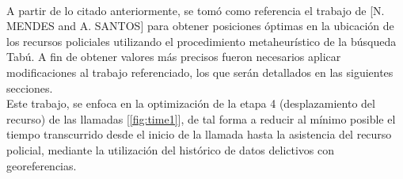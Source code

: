 \\A partir de lo citado anteriormente, se tomó como referencia el trabajo de [N. MENDES and A. SANTOS]\cite{mendesd} para obtener posiciones óptimas en la ubicación de los recursos policiales utilizando el procedimiento metaheurístico de la búsqueda Tabú. A fin de obtener valores más precisos fueron necesarios aplicar modificaciones al trabajo referenciado, los que serán detallados en las siguientes secciones.\\
Este trabajo, se enfoca en la optimización de la etapa 4 (desplazamiento del recurso) de las llamadas [\cref{fig:time1}], de tal forma a reducir al mínimo posible el tiempo transcurrido desde el inicio de la llamada hasta la asistencia del recurso policial, mediante la utilización del histórico de datos delictivos con georeferencias.